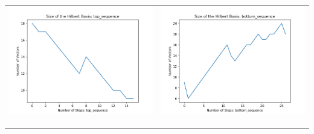 \documentclass[10pt]{article}
\begin{document}
\begin{tabular}{c|c}
\begin{minipage}{.4\textwidth}
\includegraphics[width=\textwidth]{"DATA/4d/5 generators 2 bound I/top_sequence SIZE"}
\end{minipage} &
\begin{minipage}{.4\textwidth}
\includegraphics[width=\textwidth]{"DATA/4d/5 generators 2 bound I bottomup/bottom_sequence SIZE"}
\end{minipage} \\ \\
\hline \\\begin{minipage}{.4\textwidth}

\end{minipage}
\end{tabular}
\end{document}
